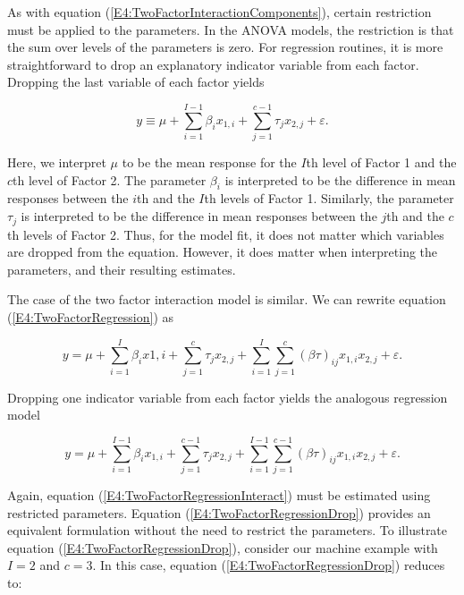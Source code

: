 As with equation (\ref{E4:TwoFactorInteractionComponents}), certain
restriction must be applied to the parameters. In the ANOVA models,
the restriction is that the sum over levels of the parameters is
zero. For regression routines, it is more straightforward to drop an
explanatory indicator variable from each factor. Dropping the last
variable of each factor yields

\begin{equation*}
y\equiv \mu +\sum_{i=1}^{I-1}\beta_ix_{1,i}+\sum_{j=1}^{c-1}\tau
_{j}x_{2,j} + \varepsilon.
\end{equation*}

\noindent Here, we interpret $\mu$ to be the mean response for the
$I$th level of Factor 1 and the $c$th level of Factor 2. The
parameter $\beta_i$ is interpreted to be the difference in mean
responses between the $i$th and the $I$th levels of Factor 1.
Similarly, the parameter $\tau_{j}$ is interpreted to be the
difference in mean responses between the $j$th and the $c$th levels
of Factor 2. Thus, for the model fit, it does not matter which
variables are dropped from the equation. However, it does matter
when interpreting the parameters, and their resulting estimates.

The case of the two factor interaction model is similar. We can
rewrite equation (\ref{E4:TwoFactorRegression}) as

\begin{equation} \label{E4:TwoFactorRegressionInteract}
y=\mu +\sum_{i=1}^{I}\beta_ix1,i+\sum_{j=1}^{c}\tau
_{j}x_{2,j}+\sum_{i=1}^{I}\sum_{j=1}^{c}(\beta \tau
)_{ij}x_{1,i}x_{2,j}+ \varepsilon.
\end{equation}

\noindent Dropping one indicator variable from each factor yields
the analogous regression model

\begin{equation}  \label{E4:TwoFactorRegressionDrop}
y=\mu +\sum_{i=1}^{I-1}\beta_ix_{1,i}+\sum_{j=1}^{c-1}\tau
_{j}x_{2,j}+\sum_{i=1}^{I-1}\sum_{j=1}^{c-1}(\beta \tau
)_{ij}x_{1,i}x_{2,j} + \varepsilon.
\end{equation}

Again, equation (\ref{E4:TwoFactorRegressionInteract}) must be
estimated using restricted parameters. Equation
(\ref{E4:TwoFactorRegressionDrop}) provides an equivalent
formulation without the need to restrict the parameters. To
illustrate equation (\ref{E4:TwoFactorRegressionDrop}), consider our
machine example with $I=2$ and $c=3$. In this case, equation
(\ref{E4:TwoFactorRegressionDrop}) reduces to:


